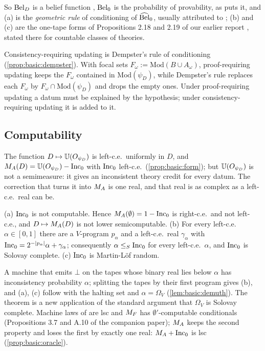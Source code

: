 So $\mathrm{Bel}_D$ is a belief function \citep{shafer1976mathematical}, $\mathrm{Bel}_0$ is the probability of provability, as \citet{pearl1988probabilistic} puts it, and (a) is the \emph{geometric rule} of conditioning of $\widehat{\mathrm{Bel}}_0$, usually attributed to \citet{suppes1977using}; (b) and (c) are the one-tape forms of Propositions 2.18 and 2.19 of our earlier report \citep{claude2026axiominduction}, stated there for countable classes of theories.

Consistency-requiring updating is Dempster's rule of conditioning \citep{dempster1967upper,shafer1976mathematical} (\cref{prop:basic:dempster}). With focal sets $F_\omega:=\mathrm{Mod}(B\cup A_\omega)$, proof-requiring updating keeps the $F_\omega$ contained in $\mathrm{Mod}(\psi_D)$, while Dempster's rule replaces each $F_\omega$ by $F_\omega\cap\mathrm{Mod}(\psi_D)$ and drops the empty ones. Under proof-requiring updating a datum must be explained by the hypothesis; under consistency-requiring updating it is added to it.

\subsection{Computability}\label{sec:basic:computability}

The function $D\mapsto\mathbb{U}(O_{\psi_D})$ is left-c.e.\ uniformly in $D$, and $M_{A}(D)=\mathbb{U}(O_{\psi_D})-\mathrm{Inc}_0$ with $\mathrm{Inc}_0$ left-c.e.\ (\cref{prop:basic:form}); but $\mathbb{U}(O_{\psi_D})$ is not a semimeasure: it gives an inconsistent theory credit for every datum. The correction that turns it into $M_{A}$ is one real, and that real is as complex as a left-c.e.\ real can be.

\begin{theorem}\label{thm:basic:inc}
(a) $\mathrm{Inc}_0$ is not computable. Hence $M_{A}(\emptyset)=1-\mathrm{Inc}_0$ is right-c.e.\ and not left-c.e., and $D\mapsto M_{A}(D)$ is not lower semicomputable. (b) For every left-c.e.\ $\alpha\in[0,1]$ there are a $V$-program $p_\alpha$ and a left-c.e.\ real $\gamma_\alpha$ with $\mathrm{Inc}_0=2^{-\lvert p_\alpha\rvert}\alpha+\gamma_\alpha$; consequently $\alpha\le_S\mathrm{Inc}_0$ for every left-c.e.\ $\alpha$, and $\mathrm{Inc}_0$ is Solovay complete. (c) $\mathrm{Inc}_0$ is Martin-L\"of random.
\end{theorem}

A machine that emits $\bot$ on the tapes whose binary real lies below $\alpha$ has inconsistency probability $\alpha$; splitting the tapes by their first program gives (b), and (a), (c) follow with the halting set and $\alpha=\Omega_V$ (\cref{lem:basic:demuth}). The theorem is a new application of the standard argument that $\Omega_V$ is Solovay complete. Machine laws of \SOIabbr are lsc and $M_{F}$ has $\emptyset'$-computable conditionals (Propositions 3.7 and A.10 of the companion paper); $M_{A}$ keeps the second property and loses the first by exactly one real: $M_{A}+\mathrm{Inc}_0$ is lsc (\cref{prop:basic:oracle}).

